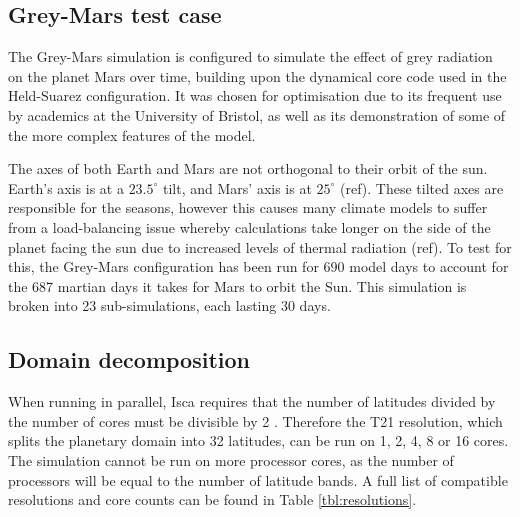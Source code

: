 \documentclass[a4paper,11pt]{report}
\begin{document}
\subsection{Grey-Mars test case}
The Grey-Mars simulation is configured to simulate the effect of grey radiation on the planet Mars over time, building upon the dynamical core code used in the Held-Suarez configuration. It was chosen for optimisation due to its frequent use by academics at the University of Bristol, as well as its demonstration of some of the more complex features of the model. 
\par
The axes of both Earth and Mars are not orthogonal to their orbit of the sun. Earth's axis is at a $23.5^{\circ}$ tilt, and Mars' axis is at $25^{\circ}$ (ref).  These tilted axes are responsible for the seasons, however this causes many climate models to suffer from a load-balancing issue whereby calculations take longer on the side of the planet facing the sun due to increased levels of thermal radiation (ref). To test for this, the Grey-Mars configuration has been run for 690 model days to account for the 687 martian days it takes for Mars to orbit the Sun. This simulation is broken into 23 sub-simulations, each lasting 30 days. 

\subsection{Domain decomposition}
When running in parallel, Isca requires that the number of latitudes divided by the number of cores must be divisible by 2 \cite{isca2019github}. Therefore the T21 resolution, which splits the planetary domain into 32 latitudes, can be run on 1, 2, 4, 8 or 16 cores. The simulation cannot be run on more processor cores, as the number of processors will be equal to the number of latitude bands. A full list of compatible resolutions and core counts can be found in Table \ref{tbl:resolutions}.
\end{document}
